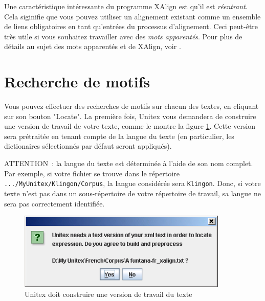 \bigskip
\noindent Une caractéristique intéressante du programme XAlign est qu'il est
\textit{réentrant}. Cela siginifie que vous pouvez utiliser
un alignement existant comme un ensemble de liens obligatoires en tant qu'entrées du processus
d'alignement. Ceci peut-être très utile si vous souhaitez travailler avec des
\textit{mots apparentés}. Pour plus de détails au sujet des mots apparentés
 et de XAlign, voir \cite{IGML_PauDum08}.

\clearpage
\section{Recherche de motifs}
Vous pouvez effectuer des recherches de motifs sur chacun des textes, en cliquant sur son bouton
"Locate". La première fois, Unitex vous demandera de construire une version de travail de votre
texte, comme le montre la figure \ref{fig-x-fig6}. Cette version sera prétraitée en tenant compte de
la langue du texte (en particulier, les dictionaires sélectionnés par défaut seront appliqués).

\bigskip
\noindent ATTENTION~: la langue du texte est déterminée à l'aide de son nom complet. Par exemple, 
si votre fichier se trouve dans le répertoire \verb+.../MyUnitex/Klingon/Corpus+, 
la langue considérée sera \verb+Klingon+. Donc, si votre texte n'est pas dans un sous-répertoire
de votre répertoire de travail, sa langue ne sera pas correctement identifiée.

\begin{figure}[!ht]
\begin{center}
\includegraphics[width=10cm]{resources/img/figX-6.png}
\caption{Unitex doit construire une version de travail du texte\label{fig-x-fig6}}
\end{center}
\end{figure}
 
